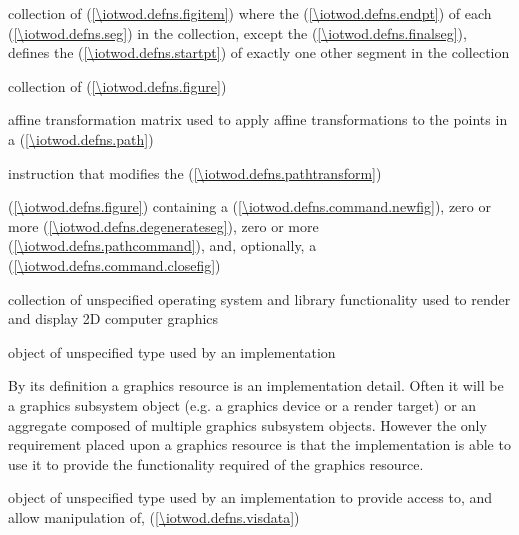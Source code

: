 %
collection of  (\ref{\iotwod.defns.figitem}) where the  (\ref{\iotwod.defns.endpt}) of each  (\ref{\iotwod.defns.seg}) in the collection, except the  (\ref{\iotwod.defns.finalseg}), defines the  (\ref{\iotwod.defns.startpt}) of exactly one other segment in the collection

%
collection of  (\ref{\iotwod.defns.figure})

%
affine transformation matrix used to apply affine transformations to the points in a  (\ref{\iotwod.defns.path})

%
instruction that modifies the  (\ref{\iotwod.defns.pathtransform})

%
 (\ref{\iotwod.defns.figure}) containing a  (\ref{\iotwod.defns.command.newfig}), zero or more  (\ref{\iotwod.defns.degenerateseg}), zero or more  (\ref{\iotwod.defns.pathcommand}), and, optionally, a  (\ref{\iotwod.defns.command.closefig})

%
collection of unspecified operating system and library functionality used to render and display 2D computer graphics

%
 object of unspecified type used by an implementation
\begin{note}
By its definition a graphics resource is an implementation detail. Often it will be a graphics subsystem object (e.g. a graphics device or a render target) or an aggregate composed of multiple graphics subsystem objects. However the only requirement placed upon a graphics resource is that the implementation is able to use it to provide the functionality required of the graphics resource.
\end{note}

%
%
 object of unspecified type used by an implementation to provide access to, and allow manipulation of,  (\ref{\iotwod.defns.visdata})

